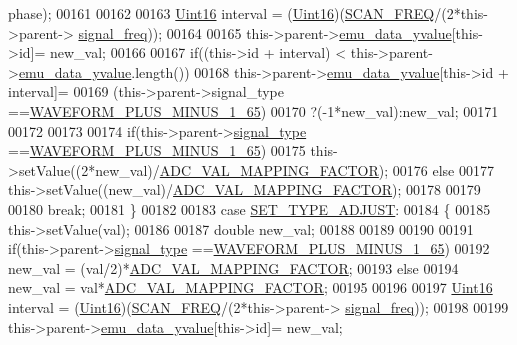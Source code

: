 \begin{DoxyCode}
      phase);
00161 
00162 
00163         \hyperlink{a00001_aae7407b021d43f7193a81a58cfb3e297}{Uint16} interval = (\hyperlink{a00001_aae7407b021d43f7193a81a58cfb3e297}{Uint16})(\hyperlink{a00031_a8127170b687c1f67a968886c128e76e4}{SCAN\_FREQ}/(2*this->parent->
      \hyperlink{a00004_a67039999d520fc483fab521fae5ddde4}{signal\_freq}));
00164 
00165         this->parent->\hyperlink{a00004_ad922d05d1e988d84f404c115fe909f72}{emu\_data\_yvalue}[this->id]= new\_val;
00166 
00167         \textcolor{keywordflow}{if}((this->\textcolor{keywordtype}{id} + interval) < this->parent->\hyperlink{a00004_ad922d05d1e988d84f404c115fe909f72}{emu\_data\_yvalue}.length())
00168         this->parent->\hyperlink{a00004_ad922d05d1e988d84f404c115fe909f72}{emu\_data\_yvalue}[this->id + interval]=
00169         (this->parent->signal\_type ==\hyperlink{a00034_a0923d3b365a36e1e8c401cec964aa36f}{WAVEFORM\_PLUS\_MINUS\_1\_65})
00170         ?(-1*new\_val):new\_val;
00171 
00172 
00173 
00174         \textcolor{keywordflow}{if}(this->parent->\hyperlink{a00004_a070edaec5aee6ba1f5a6866bc32c8ce4}{signal\_type} ==\hyperlink{a00034_a0923d3b365a36e1e8c401cec964aa36f}{WAVEFORM\_PLUS\_MINUS\_1\_65})
00175         this->setValue((2*new\_val)/\hyperlink{a00031_ada92d3eeeec0cbeee41e76a52d145792}{ADC\_VAL\_MAPPING\_FACTOR});
00176         \textcolor{keywordflow}{else}
00177         this->setValue((new\_val)/\hyperlink{a00031_ada92d3eeeec0cbeee41e76a52d145792}{ADC\_VAL\_MAPPING\_FACTOR});
00178 
00179 
00180     \textcolor{keywordflow}{break};
00181     \}
00182 
00183     \textcolor{keywordflow}{case} \hyperlink{a00034_a16b6b7b5ad68ec0dd62a3c9e97f88adb}{SET\_TYPE\_ADJUST}:
00184     \{
00185         this->setValue(val);
00186 
00187         \textcolor{keywordtype}{double} new\_val;
00188 
00189 
00190 
00191         \textcolor{keywordflow}{if}(this->parent->\hyperlink{a00004_a070edaec5aee6ba1f5a6866bc32c8ce4}{signal\_type} ==\hyperlink{a00034_a0923d3b365a36e1e8c401cec964aa36f}{WAVEFORM\_PLUS\_MINUS\_1\_65})
00192         new\_val = (val/2)*\hyperlink{a00031_ada92d3eeeec0cbeee41e76a52d145792}{ADC\_VAL\_MAPPING\_FACTOR};
00193         \textcolor{keywordflow}{else}
00194         new\_val = val*\hyperlink{a00031_ada92d3eeeec0cbeee41e76a52d145792}{ADC\_VAL\_MAPPING\_FACTOR};
00195 
00196 
00197         \hyperlink{a00001_aae7407b021d43f7193a81a58cfb3e297}{Uint16} interval = (\hyperlink{a00001_aae7407b021d43f7193a81a58cfb3e297}{Uint16})(\hyperlink{a00031_a8127170b687c1f67a968886c128e76e4}{SCAN\_FREQ}/(2*this->parent->
      \hyperlink{a00004_a67039999d520fc483fab521fae5ddde4}{signal\_freq}));
00198 
00199         this->parent->\hyperlink{a00004_ad922d05d1e988d84f404c115fe909f72}{emu\_data\_yvalue}[this->id]= new\_val;

\end{DoxyCode}
